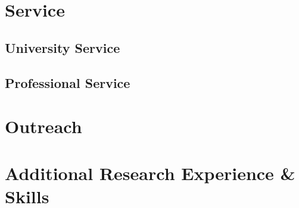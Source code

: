 \section*{Service}
\subsection*{University Service}


\subsection*{Professional Service}


\section*{Outreach}


\section*{Additional Research Experience \& Skills}


% 

% 


